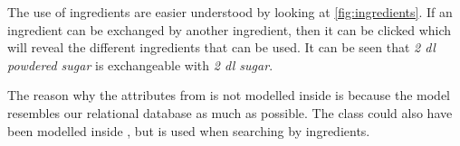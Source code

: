 The use of ingredients are easier understood by looking at \autoref{fig:ingredients}. If an ingredient can be exchanged by another ingredient, then it can be clicked which will reveal the different ingredients that can be used. It can be seen that \textit{2 dl powdered sugar} is exchangeable with \textit{2 dl sugar}.

The reason why the attributes from  is not modelled inside \linebreak{} is because the model resembles our relational database as much as possible. The  class could also have been modelled inside , but  is used when searching by ingredients.